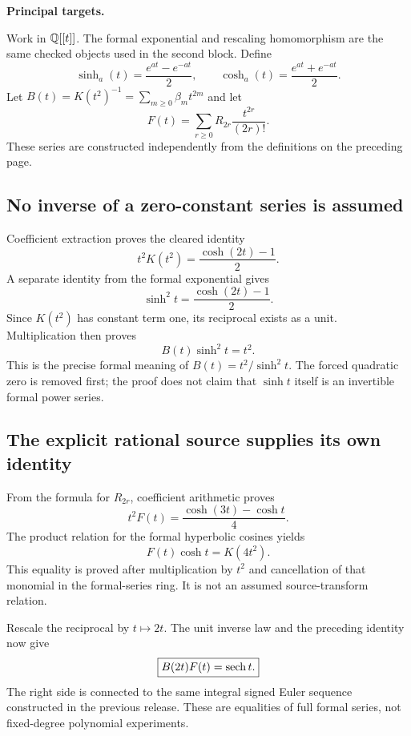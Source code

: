 \textbf{Principal targets.}\par
{}\par
{}
\par\medskip
{}
Work in $\mathbb Q[[t]]$. The formal exponential and rescaling homomorphism are the same checked objects used in the second block. Define
\[
 \sinh_a(t)=\frac{e^{at}-e^{-at}}2,\qquad
 \cosh_a(t)=\frac{e^{at}+e^{-at}}2.
\]
Let $B(t)=K(t^2)^{-1}=\sum_{m\geq0}\beta_mt^{2m}$ and let
\[
 F(t)=\sum_{r\geq0}R_{2r}\frac{t^{2r}}{(2r)!}.
\]
These series are constructed independently from the definitions on the preceding page.

\subsection*{No inverse of a zero-constant series is assumed}
Coefficient extraction proves the cleared identity
\[
 t^2K(t^2)=\frac{\cosh(2t)-1}{2}.
\]
A separate identity from the formal exponential gives
\[
 \sinh^2t=\frac{\cosh(2t)-1}{2}.
\]
Since $K(t^2)$ has constant term one, its reciprocal exists as a unit. Multiplication then proves
\[
 \boxed{B(t)\sinh^2t=t^2.}
\]
This is the precise formal meaning of $B(t)=t^2/\sinh^2t$. The forced quadratic zero is removed first; the proof does not claim that $\sinh t$ itself is an invertible formal power series.

\subsection*{The explicit rational source supplies its own identity}
From the formula for $R_{2r}$, coefficient arithmetic proves
\[
 \boxed{t^2 F(t)=\frac{\cosh(3t)-\cosh t}{4}.}
\]
The product relation for the formal hyperbolic cosines yields
\[
 F(t)\cosh t=K(4t^2).
\]
This equality is proved after multiplication by $t^2$ and cancellation of that monomial in the formal-series ring. It is not an assumed source-transform relation.

Rescale the reciprocal by $t\mapsto2t$. The unit inverse law and the preceding identity now give
\[
 \boxed{B(2t)F(t)=\operatorname{sech} t.}
\]
The right side is connected to the same integral signed Euler sequence constructed in the previous release. These are equalities of full formal series, not fixed-degree polynomial experiments.

